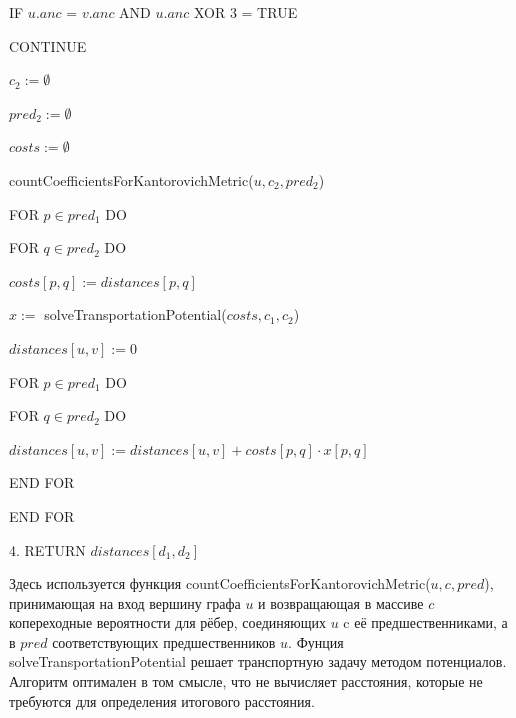 \documentclass[12pt]{report}
\begin{document}
\hspace{3cm} IF $u.anc$ = $v.anc$ AND $u.anc$ XOR 3 = TRUE 

\hspace{4cm} CONTINUE

\hspace{3cm} $c_2 := \emptyset$

\hspace{3cm} $pred_2 := \emptyset$

\hspace{3cm} $costs := \emptyset$

\hspace{3cm} countCoefficientsForKantorovichMetric($u, c_2, pred_2$)

\hspace{3cm} FOR $p \in pred_1$ DO

\hspace{4cm} FOR $q \in pred_2$ DO

\hspace{5cm} $costs[p, q] := distances[p, q]$ 

\hspace{3cm} $x := $ solveTransportationPotential($costs, c_1, c_2$)

\hspace{3cm} $distances[u, v] := 0$

\hspace{3cm} FOR $p \in pred_1$ DO

\hspace{4cm} FOR $q \in pred_2$ DO

\hspace{5cm} $distances[u, v] := distances[u, v] + costs[p, q] \cdot x[p, q]$ 

\hspace{1cm} END FOR

\hspace{0.35cm} END FOR

4. RETURN $distances[d_1, d_2]$

\vspace{1cm}

Здесь используется функция countCoefficientsForKantorovichMetric($u, c, pred$), принимающая на вход вершину графа $u$ и возвращающая в массиве $c$ копереходные вероятности для рёбер, соединяющих $u$ c её предшественниками, а в $pred$ соответствующих предшественников $u$. Фунция solveTransportationPotential решает транспортную задачу методом потенциалов. Алгоритм оптимален в том смысле, что не вычисляет расстояния, которые не требуются для определения итогового расстояния.
\end{document}
